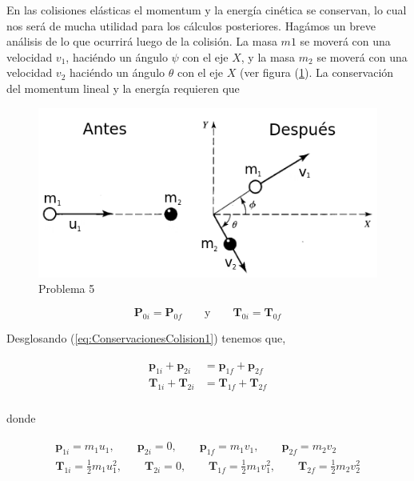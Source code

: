 \documentclass[a4paper,10pt]{article}
\numberwithin{equation}{section}
\begin{document}
En las colisiones elásticas el momentum y la energía cinética se conservan, lo cual nos 
será de mucha utilidad para los cálculos posteriores. Hagámos un breve análisis de lo 
que ocurrirá luego de la colisión. La masa $m1$ se moverá con una velocidad $v_1$,
haciéndo un ángulo $\psi$ con el eje $X$, y la masa $m_2$ se moverá con una 
velocidad $v_2$ haciéndo un ángulo $\theta$ con el eje $X$ (ver figura (\ref{fig:problema5}). La conservación 
del momentum lineal y la energía requieren que 

\begin{figure}[ht]
 \centering
\includegraphics[scale=0.5]{problema5fig1}
\caption{Problema 5}
\label{fig:problema5}
\end{figure}


\begin{equation}
 \mathbf{P}_{0i} = \mathbf{P}_{0f} \qquad \text{y} \qquad \mathbf{T}_{0i} = \mathbf{T}_{0f}
 \label{eq:ConservacionesColision1}
\end{equation}

Desglosando (\ref{eq:ConservacionesColision1}) tenemos que,

\begin{gather}
 \begin{split}
  \mathbf{p}_{1i} +  \mathbf{p}_{2i} &=   \mathbf{p}_{1f} +  \mathbf{p}_{2f} \\
  \mathbf{T}_{1i} +  \mathbf{T}_{2i} &=   \mathbf{T}_{1f} +  \mathbf{T}_{2f} \\
 \label{eq:ConservacionesColision2}
 \end{split}
\end{gather}

donde

\begin{gather*}
 \begin{split}
%
\mathbf{p}_{1i} = m_1 u_1, \qquad \mathbf{p}_{2i} = 0, \qquad \mathbf{p}_{1f} = m_1 v_1, \qquad \mathbf{p}_{2f} = m_2 v_2 \\
%
\mathbf{T}_{1i} = \frac{1}{2} m_1 u_1^2, \qquad \mathbf{T}_{2i} = 0, \qquad \mathbf{T}_{1f} = \frac{1}{2} m_1 v_1^2, \qquad \mathbf{T}_{2f} = \frac{1}{2} m_2 v_2^2 \\
%
 \end{split}
\end{gather*}
\end{document}
